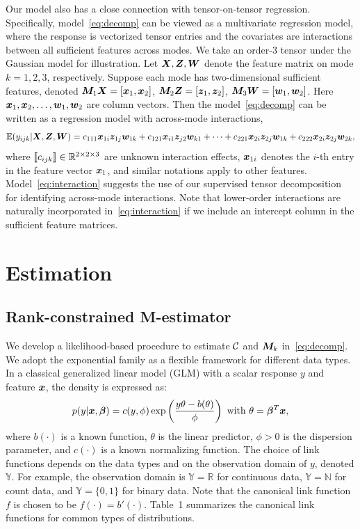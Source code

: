 \documentclass[12pt]{article}
\theoremstyle{plain}
\theoremstyle{definition}
\begin{document}
Our model also has a close connection with tensor-on-tensor regression. Specifically, model~\eqref{eq:decomp} can be viewed as a multivariate regression model, where the response is vectorized tensor entries and the covariates are interactions between all sufficient features across modes. We take an order-3 tensor under the Gaussian model for illustration. Let $\bm X,\bm Z,\bm{W}$ denote the feature matrix on mode $k=1, 2, 3$, respectively. Suppose each mode has two-dimensional sufficient features, denoted $\bm M_1\bm X=[\bm x_1,\bm x_2]$, $\bm M_2\bm Z=[\bm{z}_1,\bm{z}_2]$, $\bm M_3\bm{W}=[\bm{w}_1,\bm{w}_2]$. Here $\bm x_1,\bm x_2,\ldots,\bm{w}_1, \bm{w}_2$ are column vectors. Then the model~\eqref{eq:decomp} can be written as a regression model with across-mode interactions,
\begin{equation}\label{eq:interaction}
\mathbb{E}(y_{ijk}|\bm X,\bm Z,\bm{W})=c_{111}\bm x_{1i}\bm{z}_{1j}\bm{w}_{1k}+c_{121}\bm x_{i1}\bm{z}_{j2}\bm{w}_{k1}+\cdots+c_{221}\bm x_{2i}\bm{z}_{2j}\bm{w}_{1k}+c_{222}\bm x_{2i}\bm{z}_{2j}\bm{w}_{2k},
\end{equation}
where $\llbracket c_{ijk} \rrbracket \in \mathbb{R}^{2\times 2\times 3}$ are unknown interaction effects, $\bm x_{1i}$ denotes the $i$-th entry in the feature vector $\bm x_1$, and similar notations apply to other features. Model~\eqref{eq:interaction} suggests the use of our supervised tensor decomposition for identifying across-mode interactions. Note that lower-order interactions are naturally incorporated in~\eqref{eq:interaction} if we include an intercept column in the sufficient feature matrices.  


\section{Estimation}\label{sec:est}

\subsection{Rank-constrained M-estimator}
We develop a likelihood-based procedure to estimate $\mathcal{C}$ and $\bm M_k$ in~\eqref{eq:decomp}. We adopt the exponential family as a flexible framework for different data types. In a classical generalized linear model (GLM) with a scalar response $y$ and feature $\bm x$, the density is expressed as:
\[
p(y|\bm x, \boldsymbol{\beta})=c(y,\phi)\exp\left({y\theta- b(\theta) \over \phi}\right)\ \text{with}\ \theta=\boldsymbol{\beta}^T\bm x,
\]
where $b(\cdot)$ is a known function, $\theta$ is the linear predictor, $\phi>0$ is the dispersion parameter, and $c(\cdot)$ is a known normalizing function. The choice of link functions depends on the data types and on the observation domain of $y$, denoted $\mathbb{Y}$. For example, the observation domain is $\mathbb{Y}=\mathbb{R}$ for continuous data, $\mathbb{Y}=\mathbb{N}$ for count data, and  $\mathbb{Y}=\{0,1\}$ for binary data. 
Note that the canonical link function $f$ is chosen to be $f(\cdot)=b'(\cdot)$. Table~1 summarizes the canonical link functions for common types of distributions. 
\end{document}
